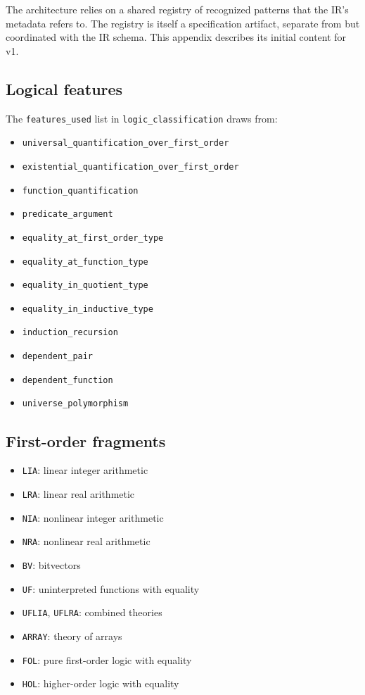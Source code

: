 \documentclass[11pt,letterpaper]{article}
\theoremstyle{definition}
\theoremstyle{remark}
\begin{document}
The architecture relies on a shared registry of recognized patterns
that the IR's metadata refers to. The registry is itself a
specification artifact, separate from but coordinated with the IR
schema. This appendix describes its initial content for v1.

\subsection{Logical features}
\label{app:logic-features}

The \texttt{features\_used} list in
\texttt{logic\_classification} draws from:

\begin{itemize}[leftmargin=2em]
  \item \texttt{universal\_quantification\_over\_first\_order}
  \item \texttt{existential\_quantification\_over\_first\_order}
  \item \texttt{function\_quantification}
  \item \texttt{predicate\_argument}
  \item \texttt{equality\_at\_first\_order\_type}
  \item \texttt{equality\_at\_function\_type}
  \item \texttt{equality\_in\_quotient\_type}
  \item \texttt{equality\_in\_inductive\_type}
  \item \texttt{induction\_recursion}
  \item \texttt{dependent\_pair}
  \item \texttt{dependent\_function}
  \item \texttt{universe\_polymorphism}
\end{itemize}

\subsection{First-order fragments}
\label{app:fragments}

\begin{itemize}[leftmargin=2em]
  \item \texttt{LIA}: linear integer arithmetic
  \item \texttt{LRA}: linear real arithmetic
  \item \texttt{NIA}: nonlinear integer arithmetic
  \item \texttt{NRA}: nonlinear real arithmetic
  \item \texttt{BV}: bitvectors
  \item \texttt{UF}: uninterpreted functions with equality
  \item \texttt{UFLIA}, \texttt{UFLRA}: combined theories
  \item \texttt{ARRAY}: theory of arrays
  \item \texttt{FOL}: pure first-order logic with equality
  \item \texttt{HOL}: higher-order logic with equality
\end{itemize}
\end{document}
